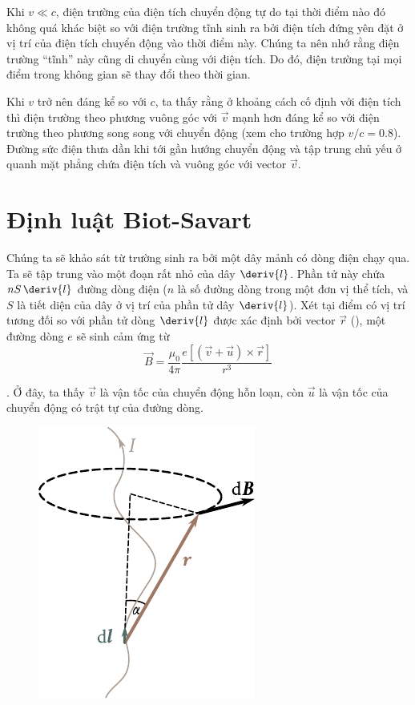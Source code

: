 Khi $v\ll c$, điện trường của điện tích chuyển động tự do tại thời điểm nào đó không quá khác biệt so với điện trường tĩnh sinh ra bởi điện tích đứng yên đặt ở vị trí của điện tích chuyển động vào thời điểm này. Chúng ta nên nhớ rằng điện trường ``tĩnh'' này cũng di chuyển cùng với điện tích. Do đó, điện trường tại mọi điểm trong không gian sẽ thay đổi theo thời gian.

Khi $v$ trở nên đáng kể so với $c$, ta thấy rằng ở khoảng cách cố định với điện tích thì điện trường theo phương vuông góc với $\vec{v}$ mạnh hơn đáng kể so với điện trường theo phương song song với chuyển động (xem  cho trường hợp $v/c=0.8$). Đường sức điện thưa dần khi tới gần hướng chuyển động và tập trung chủ yếu ở quanh mặt phẳng chứa điện tích và vuông góc với vector $\vec{v}$.

\section{Định luật Biot-Savart}\label{sec:6_4}

Chúng ta sẽ khảo sát từ trường sinh ra bởi một dây mảnh có dòng điện chạy qua. Ta sẽ tập trung vào một đoạn rất nhỏ của dây $\deriv{l}$. Phần tử này chứa $nS\, \deriv{l}$ đường dòng điện ($n$ là số đường dòng trong một đơn vị thể tích, và $S$ là tiết diện của dây ở vị trí của phần tử dây $\deriv{l}$). Xét tại điểm có vị trí tương đối so với phần tử dòng $\deriv{l}$ được xác định bởi vector $\vec{r}$ (), một đường dòng $e$ sẽ sinh cảm ứng từ
\begin{equation*}
    \vec{B} = \frac{\mu_0}{4\pi} \frac{e [(\vec{v} + \vec{u}) \times \vec{r}]}{r^3}
\end{equation*}

. Ở đây, ta thấy $\vec{v}$ là vận tốc của chuyển động hỗn loạn, còn $\vec{u}$ là vận tốc của chuyển động có trật tự của đường dòng.

\begin{figure}[t]
	\begin{center}
		\includegraphics[scale=1]{figures/ch_06/fig_6_3.pdf}
		\caption[]{}
		\label{fig:6_3}
	\end{center}
	\vspace{-0.8cm}
\end{figure}

